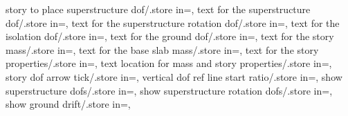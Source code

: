 {	story to place superstructure dof/.store in=\doftextstory,
	text for the superstructure dof/.store in=\doftext,
	text for the superstructure rotation dof/.store in=\rotationdoftext,
	text for the isolation dof/.store in=\isodoftext,
	text for the ground dof/.store in=\grounddoftext,
	text for the story mass/.store in=\storymasstext,
	text for the base slab mass/.store in=\basemasstext,
	text for the story properties/.store in=\storyproptext,
	text location for mass and story properties/.store in=\massproploc,
	story dof arrow tick/.store in=\storydofendtick,
	vertical dof ref line start ratio/.store in=\vertreflineratio,
	show superstructure dofs/.store in=\showsuperstructuredof,
	show superstructure rotation dofs/.store in=\showsuperstructurerotationdof,
	show ground drift/.store in=\showgrounddrift,}
\newcommand{\lumpedmass}[1][]{
\pgfkeys{/lumpedmass, default, #1}
\tikzmath{
int \nstory, \ncol, \nlev, \nlevmo, \ncolmo, \iii, \jjj, \kkk, \showss;
real \storyheight, \startx, \starty, \xx, \y;
real \supw, \suph, \isow, \isot, \foundt, \massrad;
real \axissp, \framelinet, \baselinet, \isolinet;
real \rigbasestartx, \rigbaseendx, \isoboty, \isotopy;
real \foundboty, \foundtopy, \foundstartx, \foundendx;
int \showmass, \showdeflectedshape;
real \arrowlenratio, \minlen, \dofxx, \dofyy, \arrlen, \arrrad;
real \driftdist, \driftcurve, \driftcurveratioy, \driftcurveratiox, \rotdofradius;
real \arrlen, \arrwid;
int \showsuperstructuredof, \doftextstory, \doftextfloor;
real \grdofarrstartx, \grdofarrstarty, \grdofarrendx, \grdofarrendy, \grdoftickboty, \grdofticktopy;
real \vertrefineratio;
int \showgrounddrift;
real \tempmasslimit;
int \starttickstatus;
\storyheight = \storyheight;
\startx = \startx;
\starty = \starty;
\supw = \supw;
\suph = \suph;
\isow = \isow;
\isot = \isot;
\foundt = \foundt;
\framelinet = \framelinet;
\baselinet = \baselinet;
\isolinet = \isolinet;
\massrad = \massrad;
\baseslabw = \baseslabw;
\baseslabh = \baseslabh;
\foundationw = \foundationw;
\axeslenX = \axeslenX;
\axeslenY = \axeslenY;
\driftdist = \driftdist;
\driftcurveratiox = \driftcurveratiox;
\driftcurveratioy = \driftcurveratioy;
\basedriftdist = \basedriftdist;
\foundationdrift = \foundationdrift;
\arrlen = \arrlen;
\arrwid = \arrwid;
\storydofendtick = \storydofendtick;
\rotdofradius =\rotdofradius;
\axissp = 0.2cm;
\baywidth = 0;  %
\nbays = 0;  %
\ncol = \nbays+1; %
\nlev = \nstory+1; %
if \nstory>1 then {\nlevmo = \nlev-1;} else {\nlevmo=2;};
}}
